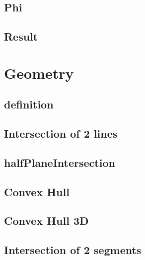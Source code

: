 \documentclass[a4paper,10pt,twocolumn,oneside]{article}
\begin{document}
\subsection{Phi}


\subsection{Result}


\section{Geometry}

% 

\subsection{definition}


\subsection{Intersection of 2 lines}


% 
\subsection{halfPlaneIntersection}


\subsection{Convex Hull}


\subsection{Convex Hull 3D}


\subsection{Intersection of 2 segments}

\end{document}
